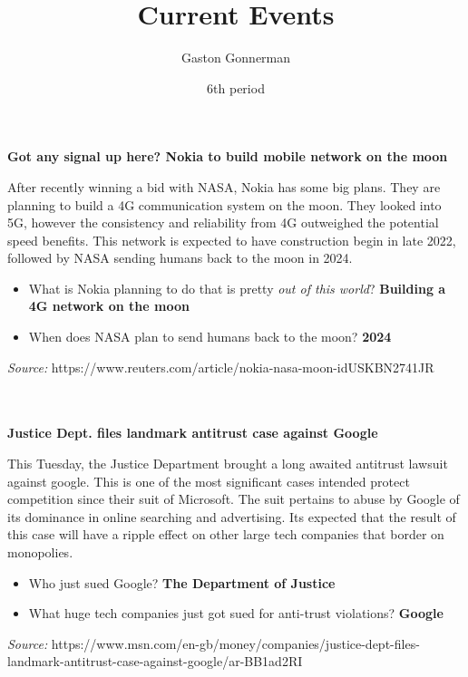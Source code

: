 \documentclass{article}
\title{Current Events}
\author{Gaston Gonnerman}
\date{6th period}
\begin{document}
	\maketitle
	
	\begin{center}
		\large{
			\textbf{Got any signal up here? Nokia to build mobile network on the moon}
		}
	\end{center}
	\par After recently winning a bid with NASA, Nokia has some big plans. They are planning to build a 4G communication system on the moon. They looked into 5G, however the consistency and reliability from 4G outweighed the potential speed benefits. This network is expected to have construction begin in late 2022, followed by NASA sending humans back to the moon in 2024.
	
	\begin{itemize}[label=--]
		\item What is Nokia planning to do that is pretty \emph{out of this world}? \textbf{Building a 4G network on the moon}
		\item When does NASA plan to send humans back to the moon? \textbf{2024}
	\end{itemize}

	\noindent
	\emph{Source:} https://www.reuters.com/article/nokia-nasa-moon-idUSKBN2741JR
	\\ \\ \\
	
	\begin{center}
		\large{
			\textbf{Justice Dept. files landmark antitrust case against Google}
		}
	\end{center}
	\par This Tuesday, the Justice Department brought a long awaited antitrust lawsuit against google. This is one of the most significant cases intended protect competition since their suit of Microsoft. The suit pertains to abuse by Google of its dominance in online searching and advertising. Its expected that the result of this case will have a ripple effect on other large tech companies that  border on monopolies.
	
	\begin{itemize}[label=--]
		\item Who just sued Google? \textbf{The Department of Justice}
		\item What huge tech companies just got sued for anti-trust violations? \textbf{Google}
	\end{itemize}

	\noindent
	\emph{Source:} https://www.msn.com/en-gb/money/companies/justice-dept-files-landmark-antitrust-case-against-google/ar-BB1ad2RI
\end{document}
